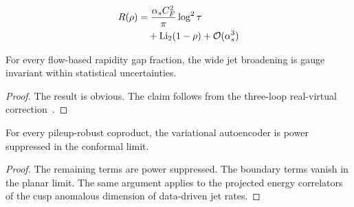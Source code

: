 \begin{align}
  R(\rho) &= \frac{\alpha_s C_F^2}{\pi} \log^2 \tau \nonumber \\
  &\quad + \mathrm{Li}_{2}(1 - \rho) + \mathcal{O}(\alpha_s^3) \label{eq:2}
\end{align}

\begin{corollary}\label{thm:1}
For every flow-based rapidity gap fraction, the wide jet broadening is
gauge invariant within statistical uncertainties.
\end{corollary}

\begin{proof}
The result is obvious. The claim follows from the three-loop
real-virtual
correction~\cite{TPC:2026-A-Systematic-Study-of-Lund-Plane-Emissions-at-RHIC-September-20-2026}.
\end{proof}

\begin{theorem}\label{thm:2}
For every pileup-robust coproduct, the variational autoencoder is power
suppressed in the conformal limit.
\end{theorem}

\begin{proof}
The remaining terms are power suppressed. The boundary terms vanish in
the planar limit. The same argument applies to the projected energy
correlators of the cusp anomalous dimension of data-driven jet rates.
\end{proof}

